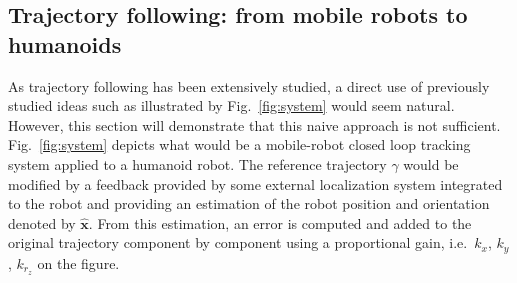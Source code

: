 \subsection{Trajectory following: from mobile robots to humanoids}
%
%
As trajectory following has been extensively studied, a direct use of
previously studied ideas such as illustrated by Fig.~\ref{fig:system}
would seem natural. However, this section will demonstrate that this
naive approach is not sufficient.
%
%
Fig.~\ref{fig:system} depicts what would be a mobile-robot closed loop
tracking system applied to a humanoid robot. The reference trajectory
$\gamma$ would be modified by a feedback provided by some external
localization system integrated to the robot and providing an
estimation of the robot position and orientation denoted by
$\hat{\mathbf{x}}$. From this estimation, an error is computed and
added to the original trajectory component by component using a
proportional gain, i.e.\ $k_x$, $k_y$, $k_{r_z}$ on the figure.


